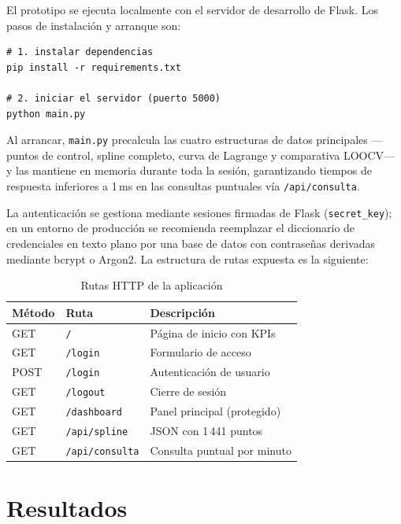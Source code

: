 \documentclass[conference]{IEEEtran}
\begin{document}
El prototipo se ejecuta localmente con el servidor de desarrollo de Flask. Los pasos de instalación y arranque son:

\begin{verbatim}
# 1. instalar dependencias
pip install -r requirements.txt

# 2. iniciar el servidor (puerto 5000)
python main.py
\end{verbatim}

Al arrancar, \texttt{main.py} precalcula las cuatro estructuras de datos principales —puntos de control, spline completo, curva de Lagrange y comparativa
LOOCV— y las mantiene en memoria durante toda la sesión, garantizando tiempos de respuesta inferiores a 1\,ms en las consultas puntuales vía
\texttt{/api/consulta}.

La autenticación se gestiona mediante sesiones firmadas de Flask (\texttt{secret\_key}); en un entorno de producción se recomienda reemplazar el
diccionario de credenciales en texto plano por una base de datos con contraseñas derivadas mediante bcrypt o Argon2. La estructura de rutas expuesta es la
siguiente:

\begin{table}[h]
\caption{Rutas HTTP de la aplicación}
\label{tab:rutas}
\centering
\begin{tabular}{lll}
\toprule
\textbf{Método} & \textbf{Ruta} & \textbf{Descripción} \\
\midrule
GET  & \texttt{/}              & Página de inicio con KPIs \\
GET  & \texttt{/login}         & Formulario de acceso       \\
POST & \texttt{/login}         & Autenticación de usuario   \\
GET  & \texttt{/logout}        & Cierre de sesión           \\
GET  & \texttt{/dashboard}     & Panel principal (protegido)\\
GET  & \texttt{/api/spline}    & JSON con 1\,441 puntos     \\
GET  & \texttt{/api/consulta}  & Consulta puntual por minuto\\
\bottomrule
\end{tabular}
\end{table}

\section{Resultados}
\label{sec:resultados}
\end{document}
